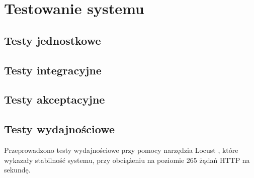 \clearpage %

\section{Testowanie systemu}

\subsection{Testy jednostkowe}

\subsection{Testy integracyjne}

\subsection{Testy akceptacyjne}

\subsection{Testy wydajnościowe}

Przeprowadzono testy wydajnościowe przy pomocy narzędzia Locust \cite{locust}, które wykazały stabilność systemu, przy obciążeniu na poziomie 265 żądań HTTP na sekundę.